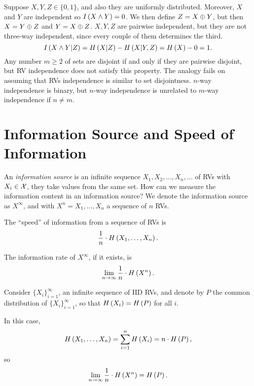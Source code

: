 Suppose $X, Y, Z \in \{0, 1\}$, and also they are uniformly distributed.
Moreover, $X$ and $Y$ are independent so $I \left( {X \land Y} \right) = 0$.
We then define $Z = X \oplus Y$, but then $X = Y \oplus Z$ and $Y = X \oplus Z$.
$X, Y, Z$ are pairwise independent, but they are not three-way independent, since every couple of them determines the third.
\begin{equation*}
	I \left( {X \land Y | Z} \right)
	=
	H\left({X | Z}\right) - H\left({X | Y, Z}\right)
	=
	H\left({X}\right) - 0
	= 1.
\end{equation*}
Any number $m \ge 2$ of sets are disjoint if and only if they are pairwise disjoint, but \ac{RV} independence does not satisfy this property.
The analogy fails on assuming that \acp{RV} independence is similar to set disjointness.
$n$-way independence is binary, but $n$-way independence is unrelated to $m$-way independence if $n \neq m$.

\section{Information Source and Speed of Information}

An \emph{information source} is an infinite sequence $X_1, X_2, \dots, X_n, \dots$ of \acp{RV} with $X_i \in \mathcal{X}$, \ie they take values from the same set.
How can we measure the information content in an information source?
We denote the information source as $X^\infty$, and with $X^n = X_1, \dots, X_n$ a sequence of $n$ \acp{RV}.

The ``speed'' of information from a sequence of \acp{RV} is 
\begin{equation*}
	\frac{1}{n} \cdot H\left({X_1, \dots, X_n}\right).
\end{equation*}

The information rate of $X^\infty$, if it exists, is
\begin{equation*}
	\lim_{n \to \infty} \frac{1}{n} \cdot H\left({X^n}\right). 
\end{equation*}


Consider $\{X_i\}_{i = 1}^\infty$, an infinite sequence of \ac{IID} \acp{RV}, and denote by $P$ the common distribution of $\{X_i\}_{i = 1}^\infty$, so that $H\left({X_i}\right) = H\left({P}\right)$ for all $i$.

In this case,
\begin{equation*}
	H\left({X_1, \dots, X_n}\right) =
	\sum_{i = 1}^n H\left({X_i}\right) =
	n \cdot H\left({P}\right),
\end{equation*}
so
\begin{equation*}
	\lim_{n \to \infty} \frac{1}{n} \cdot H\left({X^n}\right) = H\left({P}\right).
\end{equation*}

